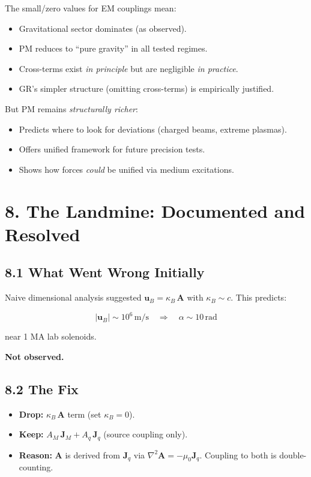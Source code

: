 \documentclass{article}
\begin{document}
The small/zero values for EM couplings mean:

\begin{itemize}
    \item Gravitational sector dominates (as observed).
    \item PM reduces to ``pure gravity'' in all tested regimes.
    \item Cross-terms exist \emph{in principle} but are negligible \emph{in practice}.
    \item GR's simpler structure (omitting cross-terms) is empirically justified.
\end{itemize}

But PM remains \emph{structurally richer}:

\begin{itemize}
    \item Predicts where to look for deviations (charged beams, extreme plasmas).
    \item Offers unified framework for future precision tests.
    \item Shows how forces \emph{could} be unified via medium excitations.
\end{itemize}

\section*{8. The Landmine: Documented and Resolved}

\subsection*{8.1 What Went Wrong Initially}

Naive dimensional analysis suggested $\mathbf u_B = \kappa_B\,\mathbf A$ with
$\kappa_B \sim c$. This predicts:



\[
|\mathbf u_B| \sim 10^6\,\text{m/s} \quad\Rightarrow\quad \alpha \sim 10\,\text{rad}
\]



near 1 MA lab solenoids.

\textbf{Not observed.}

\subsection*{8.2 The Fix}

\begin{itemize}
    \item \textbf{Drop:} $\kappa_B\,\mathbf A$ term (set $\kappa_B = 0$).
    \item \textbf{Keep:} $A_M\,\mathbf J_M + A_q\,\mathbf J_q$ (source coupling only).
    \item \textbf{Reason:} $\mathbf A$ is derived from $\mathbf J_q$ via $\nabla^2\mathbf A = -\mu_0\mathbf J_q$. Coupling to both is double-counting.
\end{itemize}
\end{document}
